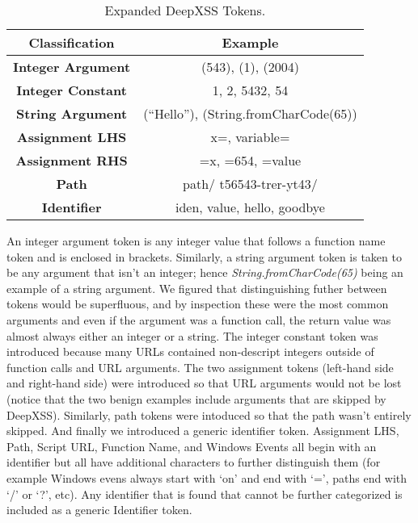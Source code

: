 \begin{table}
\begin{center}
\begingroup
\setlength{\tabcolsep}{5pt} %
\renewcommand{\arraystretch}{1.5} %
\begin{tabular}{||c | c||} 
    \hline
    Classification & Example \\ [0.5ex] 
    \hline\hline
    \textbf{Integer Argument} &  (543), (1), (2004) \\ 
    \hline
    \textbf{Integer Constant} &  1, 2, 5432, 54 \\ 
    \hline
    \textbf{String Argument} & (``Hello''), (String.fromCharCode(65)) \\
    \hline
    \textbf{Assignment LHS} & x=, variable= \\
    \hline
    \textbf{Assignment RHS} & =x, =654, =value \\
    \hline
    \textbf{Path} & path/ t56543-trer-yt43/ \\ 
    \hline
    \textbf{Identifier} & iden, value, hello, goodbye \\ [1ex] 
    \hline
\end{tabular}
\endgroup
\caption{\label{exp:tok:tab}Expanded DeepXSS Tokens.}
\end{center}
\end{table}

An integer argument token is any integer value that follows a function name token and is enclosed in brackets. Similarly, a string argument token is taken to be any argument that isn't an integer; hence \textit{String.fromCharCode(65)} being an example of a string argument. We figured that distinguishing futher between tokens would be superfluous, and by inspection these were the most common arguments and even if the argument was a function call, the return value was almost always either an integer or a string. The integer constant token was introduced because many URLs contained non-descript integers outside of function calls and URL arguments. The two assignment tokens (left-hand side and right-hand side) were introduced so that URL arguments would not be lost (notice that the two benign examples include arguments that are skipped by DeepXSS). Similarly, path tokens were intoduced so that the path wasn't entirely skipped. And finally we introduced a generic identifier token. Assignment LHS, Path, Script URL, Function Name, and Windows Events all begin with an identifier but all have additional characters to further distinguish them (for example Windows evens always start with `on' and end with `=', paths end with `/' or `?', etc). Any identifier that is found that cannot be further categorized is included as a generic Identifier token.

